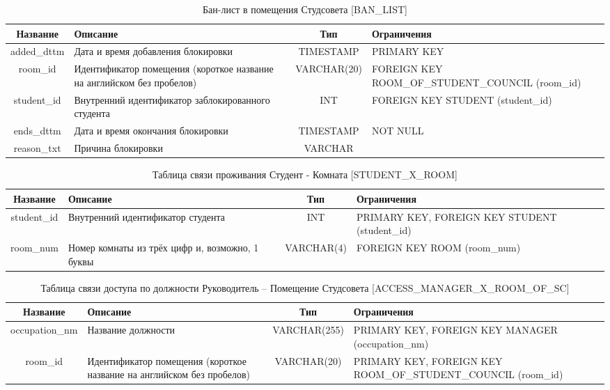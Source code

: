 \documentclass[a4paper,]{article}
\begin{document}
\begin{table}[H]
	\footnotesize
	\center
	\begin{tabular}[center]{|c|p{4cm}|c|p{4.8cm}|}
		\hline
		Название & Описание & Тип & Ограничения \\ \hline
		added\_dttm & Дата и время добавления блокировки & TIMESTAMP & PRIMARY KEY \\ \hline
		room\_id & Идентификатор помещения (короткое название на английском без пробелов) & VARCHAR(20) & FOREIGN KEY ROOM\_OF\_STUDENT\_COUNCIL (room\_id)
		 \\ \hline
		student\_id & Внутренний идентификатор заблокированного студента & INT & FOREIGN KEY STUDENT (student\_id) \\ \hline
		ends\_dttm & Дата и время окончания блокировки & TIMESTAMP & NOT NULL \\ \hline
		reason\_txt & Причина блокировки & VARCHAR &  \\ \hline
	\end{tabular}
	\caption{Бан-лист в помещения Студсовета [BAN\_LIST]}
\end{table}

\begin{table}[H]
	\footnotesize
	\center
	\begin{tabular}[center]{|c|p{4cm}|c|p{3cm}|}
		\hline
		Название & Описание & Тип & Ограничения \\ \hline
		student\_id & Внутренний идентификатор студента & INT & PRIMARY KEY, FOREIGN KEY STUDENT (student\_id) \\ \hline
		room\_num & Номер комнаты из трёх цифр и, возможно, 1 буквы & VARCHAR(4) & FOREIGN KEY ROOM (room\_num) \\ \hline
	\end{tabular}
	\caption{Таблица связи проживания Студент - Комната [STUDENT\_X\_ROOM]}
\end{table}

\begin{table}[H]
	\footnotesize
	\center
	\begin{tabular}[center]{|c|p{4cm}|c|p{5cm}|}
		\hline
		Название & Описание & Тип & Ограничения \\ \hline
		occupation\_nm & Название должности & VARCHAR(255) & PRIMARY KEY, FOREIGN KEY MANAGER (occupation\_nm) \\ \hline
		room\_id & Идентификатор помещения (короткое название на английском без пробелов) & VARCHAR(20) & PRIMARY KEY, FOREIGN KEY ROOM\_OF\_STUDENT\_COUNCIL (room\_id) \\ \hline

	\end{tabular}
	\caption{Таблица связи доступа по должности Руководитель – Помещение Студсовета [ACCESS\_MANAGER\_X\_ROOM\_OF\_SC]}
\end{table}
\end{document}

